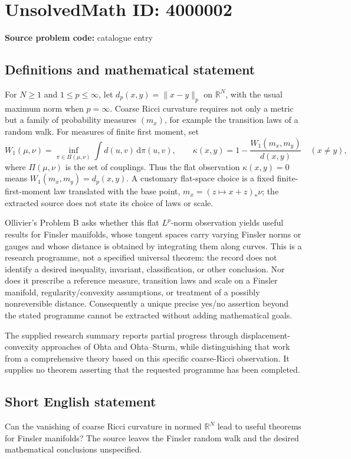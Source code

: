 \documentclass[11pt]{article}
\newcommand{\R}{\mathbb{R}}
\begin{document}
\section*{UnsolvedMath ID: 4000002}
\textbf{Source problem code:} catalogue entry
\subsection{Definitions and mathematical statement}
For \(N\ge1\) and \(1\le p\le\infty\), let \(d_p(x,y)=\|x-y\|_p\) on \(\R^N\), with the usual maximum norm when \(p=\infty\). Coarse Ricci curvature requires not only a metric but a family of probability measures \((m_x)\), for example the transition laws of a random walk. For measures of finite first moment, set
\[
W_1(\mu,\nu)=\inf_{\pi\in\Pi(\mu,\nu)}\int d(u,v)\,\mathrm d\pi(u,v),
\qquad
\kappa(x,y)=1-\frac{W_1(m_x,m_y)}{d(x,y)}\quad(x\ne y),
\]
where \(\Pi(\mu,\nu)\) is the set of couplings. Thus the flat observation \(\kappa(x,y)=0\) means \(W_1(m_x,m_y)=d_p(x,y)\). A customary flat-space choice is a fixed finite-first-moment law translated with the base point, \(m_x=(z\mapsto x+z)_*\nu\); the extracted source does not state its choice of laws or scale.

Ollivier's Problem B asks whether this flat \(L^p\)-norm observation yields useful results for Finsler manifolds, whose tangent spaces carry varying Finsler norms or gauges and whose distance is obtained by integrating them along curves. This is a research programme, not a specified universal theorem: the record does not identify a desired inequality, invariant, classification, or other conclusion. Nor does it prescribe a reference measure, transition laws and scale on a Finsler manifold, regularity/convexity assumptions, or treatment of a possibly nonreversible distance. Consequently a unique precise yes/no assertion beyond the stated programme cannot be extracted without adding mathematical goals.

The supplied research summary reports partial progress through displacement-convexity approaches of Ohta and Ohta--Sturm, while distinguishing that work from a comprehensive theory based on this specific coarse-Ricci observation. It supplies no theorem asserting that the requested programme has been completed.
\subsection{Short English statement}
Can the vanishing of coarse Ricci curvature in normed \(\R^N\) lead to useful theorems for Finsler manifolds? The source leaves the Finsler random walk and the desired mathematical conclusions unspecified.
\end{document}

